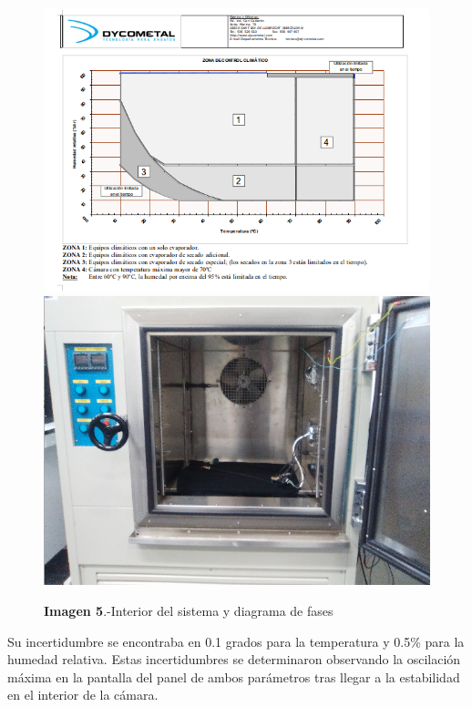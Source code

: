 \documentclass[11pt, a4paper]{article}
\begin{document}
\begin{itemize}
\begin{figure}[htb]
\centering
{
\includegraphics[scale=0.15]{FichaTecnica.png} 
}
{
\includegraphics[scale=0.15]{InteriorTemperatura.png} 
}
\caption{\textbf{Imagen 5}.-Interior del sistema y diagrama de fases}
\end{figure}

Su incertidumbre se encontraba en 0.1 grados para la temperatura y 0.5\% para la humedad relativa. Estas incertidumbres se determinaron observando la oscilación  máxima en la pantalla del panel de ambos parámetros tras llegar a la estabilidad en el interior de la cámara.


\end{itemize}
\end{document}
